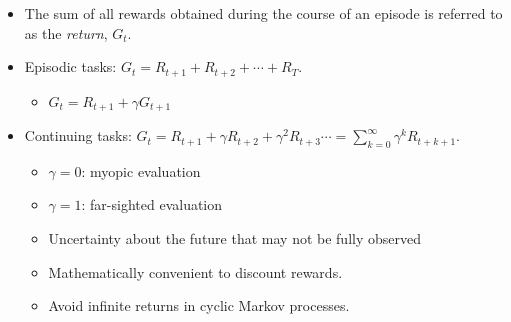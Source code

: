 \begin{itemize}
	\item The sum of all rewards obtained during the course of an episode is referred to as the \textit{return}, $G_t$.
	\item Episodic tasks: $G_t = R_{t+1} + R_{t+2} + \cdots + R_{T}.$
		\begin{itemize}
			\item $G_t = R_{t+1}+\gamma G_{t+1}$
		\end{itemize}
	\item Continuing tasks: $G_t = R_{t+1} + \gamma R_{t+2} +  \gamma^2 R_{t+3} \cdots =\sum_{k=0}^{\infty} \gamma^{k} R_{t+k+1}.$
		\begin{itemize}
			\item $\gamma=0$: myopic evaluation
			\item $\gamma=1$: far-sighted evaluation
			\item Uncertainty about the future that may not be fully observed
			\item Mathematically convenient to discount rewards. 
			\item Avoid infinite returns in cyclic Markov processes.
		\end{itemize}
\end{itemize}

